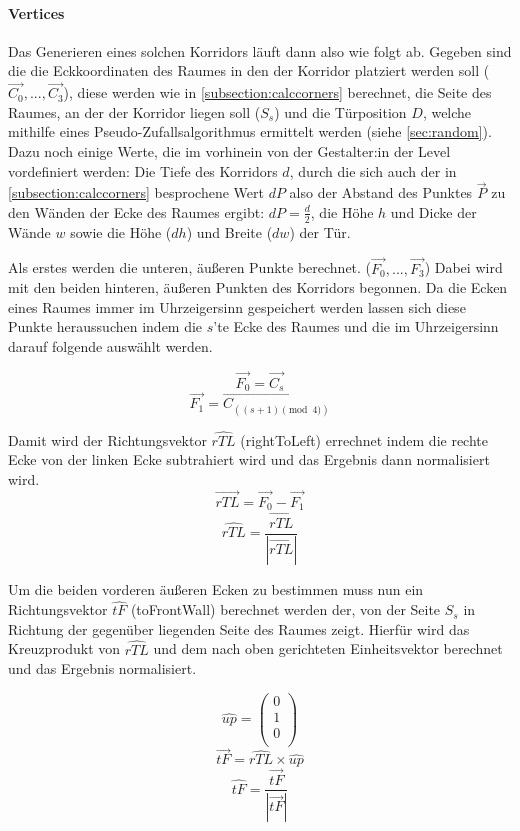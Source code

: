 \paragraph*{Vertices}

Das Generieren eines solchen Korridors läuft dann also wie folgt ab. Gegeben sind die die Eckkoordinaten des Raumes in den der Korridor platziert werden soll ($\vec{C_0}, ..., \vec{C_3}$), diese werden wie in \autoref{subsection:calccorners} berechnet, die Seite des Raumes, an der der Korridor liegen soll ($S_s$) und die Türposition $D$, welche mithilfe eines Pseudo-Zufallsalgorithmus ermittelt werden (siehe \autoref{sec:random}). Dazu noch einige Werte, die im vorhinein von der Gestalter:in der Level vordefiniert werden: Die Tiefe des Korridors $d$, durch die sich auch der in \autoref{subsection:calccorners} besprochene Wert $dP$ also der Abstand des Punktes $\vec{P}$ zu den Wänden der Ecke des Raumes ergibt: $dP = \frac{d}{2}$, die Höhe $h$ und Dicke der Wände $w$ sowie die Höhe ($dh$) und Breite ($dw$) der Tür.

Als erstes werden die unteren, äußeren Punkte berechnet. ($\vec{F_0}, ..., \vec{F_3}$)
Dabei wird mit den beiden hinteren, äußeren Punkten des Korridors begonnen. Da die Ecken eines Raumes immer im Uhrzeigersinn gespeichert werden lassen sich diese Punkte heraussuchen indem die $s$'te Ecke des Raumes und die im Uhrzeigersinn darauf folgende auswählt werden.

$$ \vec{F_0} = \vec{C_s} $$
$$ \vec{F_1} = \vec{C_{((s+1)\pmod 4)}} $$

Damit wird der Richtungsvektor $\hat{rTL}$ (rightToLeft) errechnet indem die rechte Ecke von der linken Ecke subtrahiert wird und das Ergebnis dann normalisiert wird.
$$ \vec{rTL} = \vec{F_0} - \vec{F_1} $$
$$ \hat{rTL}=\frac{\vec{rTL}}{\left | \vec{rTL} \right |} $$

Um die beiden vorderen äußeren Ecken zu bestimmen muss nun ein Richtungsvektor $\hat{tF}$ (toFrontWall) berechnet werden der, von der Seite $S_s$ in Richtung der gegenüber liegenden Seite des Raumes zeigt. Hierfür wird das Kreuzprodukt von $\hat{rTL}$ und dem nach oben gerichteten Einheitsvektor berechnet und das Ergebnis normalisiert.

$$ \hat{up} = \begin{pmatrix} 0 \\ 1 \\ 0 \\ \end{pmatrix} $$
$$ \vec{tF} = \hat{rTL} \times \hat{up} $$
$$ \hat{tF} = \frac{\vec{tF}}{\left | \vec{tF} \right |} $$

